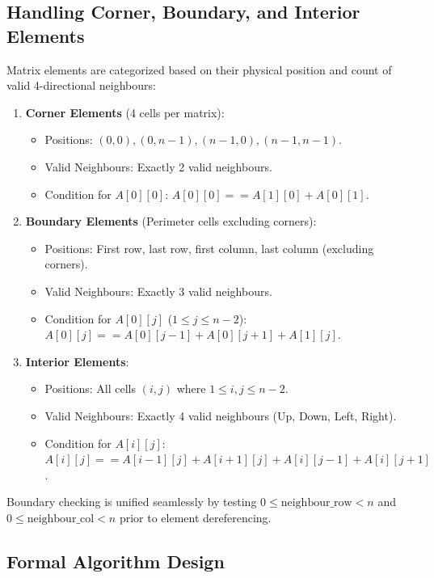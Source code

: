 \subsection{Handling Corner, Boundary, and Interior Elements}
Matrix elements are categorized based on their physical position and count of valid 4-directional neighbours:

\begin{enumerate}
    \item \textbf{Corner Elements} (4 cells per matrix):
    \begin{itemize}
        \item Positions: $(0, 0), (0, n-1), (n-1, 0), (n-1, n-1)$.
        \item Valid Neighbours: Exactly 2 valid neighbours.
        \item Condition for $A[0][0]$: $A[0][0] == A[1][0] + A[0][1]$.
    \end{itemize}
    
    \item \textbf{Boundary Elements} (Perimeter cells excluding corners):
    \begin{itemize}
        \item Positions: First row, last row, first column, last column (excluding corners).
        \item Valid Neighbours: Exactly 3 valid neighbours.
        \item Condition for $A[0][j]$ ($1 \le j \le n-2$): $A[0][j] == A[0][j-1] + A[0][j+1] + A[1][j]$.
    \end{itemize}
    
    \item \textbf{Interior Elements}:
    \begin{itemize}
        \item Positions: All cells $(i, j)$ where $1 \le i, j \le n-2$.
        \item Valid Neighbours: Exactly 4 valid neighbours (Up, Down, Left, Right).
        \item Condition for $A[i][j]$: $A[i][j] == A[i-1][j] + A[i+1][j] + A[i][j-1] + A[i][j+1]$.
    \end{itemize}
\end{enumerate}

Boundary checking is unified seamlessly by testing $0 \le \text{neighbour\_row} < n$ and $0 \le \text{neighbour\_col} < n$ prior to element dereferencing.

\subsection{Formal Algorithm Design}

